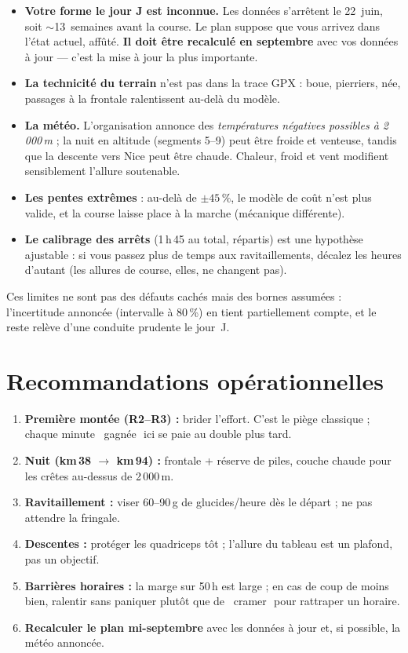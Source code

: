 \documentclass{locomotionreport}
\begin{document}
\begin{itemize}[leftmargin=1.4em]
\item \textbf{Votre forme le jour J est inconnue.} Les donn\'ees s'arr\^etent le 22~juin, soit $\sim$13~semaines avant
la course. Le plan suppose que vous arrivez dans l'\'etat actuel, affût\'e. \textbf{Il doit \^etre recalcul\'e en
septembre} avec vos donn\'ees \`a jour --- c'est la mise \`a jour la plus importante.
\item \textbf{La technicit\'e du terrain} n'est pas dans la trace GPX : boue, pierriers, n\'ee, passages \`a la
frontale ralentissent au-del\`a du mod\`ele.
\item \textbf{La m\'et\'eo.} L'organisation annonce des \emph{temp\'eratures n\'egatives possibles \`a 2\,000\,m} ; la
nuit en altitude (segments 5--9) peut \^etre froide et venteuse, tandis que la descente vers Nice peut \^etre chaude.
Chaleur, froid et vent modifient sensiblement l'allure soutenable.
\item \textbf{Les pentes extr\^emes} : au-del\`a de \(\pm45\,\%\), le mod\`ele de co\^ut n'est plus valide, et la
course laisse place \`a la marche (m\'ecanique diff\'erente).
\item \textbf{Le calibrage des arr\^ets} (1\,h\,45 au total, r\'epartis) est une hypoth\`ese ajustable : si vous
passez plus de temps aux ravitaillements, d\'ecalez les heures d'autant (les allures de course, elles, ne changent pas).
\end{itemize}

Ces limites ne sont pas des d\'efauts cach\'es mais des bornes assum\'ees : l'incertitude annonc\'ee (intervalle \`a
80\,\%) en tient partiellement compte, et le reste rel\`eve d'une conduite prudente le jour~J.

\section{Recommandations op\'erationnelles}

\begin{enumerate}[leftmargin=1.6em]
\item \textbf{Premi\`ere mont\'ee (R2--R3) :} brider l'effort. C'est le pi\`ege classique ; chaque minute \og~gagn\'ee\,\fg\
ici se paie au double plus tard.
\item \textbf{Nuit (km\,38 \(\rightarrow\) km\,94) :} frontale + r\'eserve de piles, couche chaude pour les cr\^etes
au-dessus de 2\,000\,m.
\item \textbf{Ravitaillement :} viser 60--90\,g de glucides/heure d\`es le d\'epart ; ne pas attendre la fringale.
\item \textbf{Descentes :} prot\'eger les quadriceps t\^ot ; l'allure du tableau est un plafond, pas un objectif.
\item \textbf{Barri\`eres horaires :} la marge sur 50\,h est large ; en cas de coup de moins bien, ralentir sans
paniquer plut\^ot que de \og~cramer\,\fg\ pour rattraper un horaire.
\item \textbf{Recalculer le plan mi-septembre} avec les donn\'ees \`a jour et, si possible, la m\'et\'eo annonc\'ee.
\end{enumerate}
\end{document}
